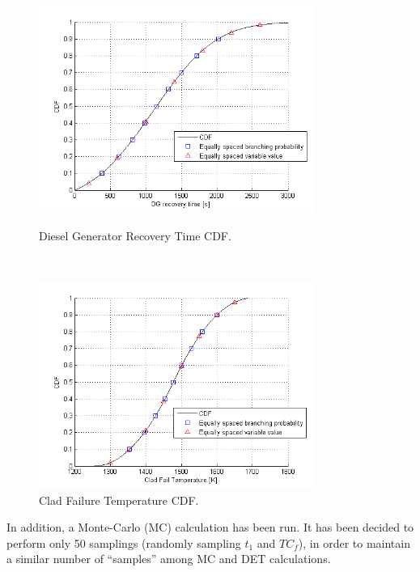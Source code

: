 \documentclass{mc2013}
\begin{document}
\vspace{-5mm}

\begin{figure}
 \begin{minipage}[b]{8.5cm}
   \centering
   \includegraphics[width=9cm]{figures/DieselRecTime.png}
   \caption{Diesel Generator Recovery Time CDF.}
   \label{fig:DGrecTime}
 \end{minipage}
 \ \hspace{2mm} \hspace{3mm} \
 \begin{minipage}[b]{8.5cm}
  \centering
   \includegraphics[width=9cm]{figures/CladFailure.png}
   \caption{Clad Failure Temperature CDF.}
   \label{fig:CladFailureDist}
 \end{minipage}
\end{figure}
In addition, a Monte-Carlo (MC) calculation has been run. It has been decided to perform only 50 samplings (randomly sampling $t_{1}$ and $TC_{f}$), in order to maintain a similar number of ``samples''  among MC and DET calculations.    
\end{document}

